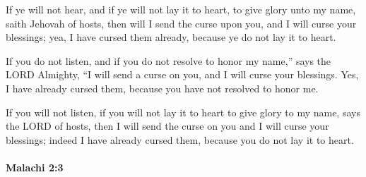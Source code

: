 			\begin{versebox}
					\item[BHS] 
					\item[LXX] 
					\item[ASV] If ye will not hear, and if ye will not lay it to heart, to give glory unto my name, saith Jehovah of hosts, then will I send the curse upon you, and I will curse your blessings; yea, I have cursed them already, because ye do not lay it to heart.
					\item[NIV] If you do not listen, and if you do not resolve to honor my name,” says the LORD Almighty, “I will send a curse on you, and I will curse your blessings. Yes, I have already cursed them, because you have not resolved to honor me.
					\item[NRSV] If you will not listen, if you will not lay it to heart to give glory to my name, says the LORD of hosts, then I will send the curse on you and I will curse your blessings; indeed I have already cursed them, because you do not lay it to heart.
			\end{versebox}

		\paragraph{Malachi 2:3} %
			\label{MALACHI-2-3}

